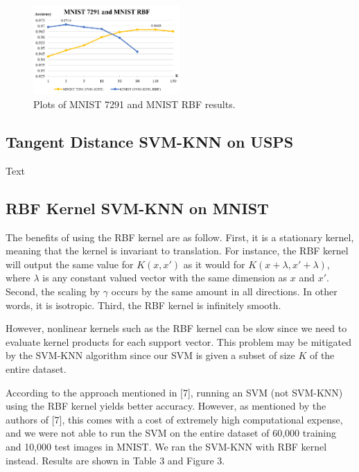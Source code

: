 \documentclass[11pt,letterpaper]{article}
\begin{document}
\begin{figure}[t!]
  \centering
  \includegraphics[keepaspectratio, width=0.5\textwidth]{mnist_rbf_7291.png}
  \caption{Plots of MNIST 7291 and MNIST RBF results.}
\end{figure}

\subsection{Tangent Distance SVM-KNN on USPS}

Text


\subsection{RBF Kernel SVM-KNN on MNIST}

The benefits of using the RBF kernel are as follow. First, it is a stationary kernel, meaning that the kernel is invariant to translation. For instance, the RBF kernel will output the same value for $K(x,x')$ as it would for $K(x+\lambda, x'+\lambda)$, where $\lambda$ is any constant valued vector with the same dimension as $x$ and $x'$. Second, the scaling by $\gamma$ occurs by the same amount in all directions. In other words, it is isotropic. Third, the RBF kernel is infinitely smooth.

However, nonlinear kernels such as the RBF kernel can be slow since we need to evaluate kernel products for each support vector. This problem may be mitigated by the SVM-KNN algorithm since our SVM is given a subset of size $K$ of the entire dataset.

According to the approach mentioned in [7], running an SVM (not SVM-KNN) using the RBF kernel yields better accuracy. However, as mentioned by the authors of [7], this comes with a cost of extremely high computational expense, and we were not able to run the SVM on the entire dataset of 60,000 training and 10,000 test images in MNIST. We ran the SVM-KNN with RBF kernel instead. Results are shown in Table 3 and Figure 3.
\end{document}
